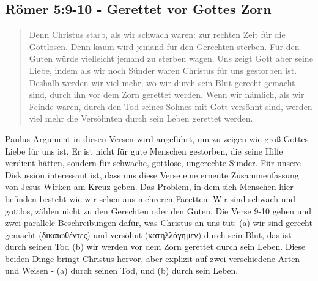 \subsection{Römer 5:9-10 - Gerettet vor Gottes Zorn}
\begin{quote}
	Denn Christus starb, als wir schwach waren: zur rechten Zeit für die Gottlosen.
	Denn kaum wird jemand für den Gerechten sterben. Für den Guten würde vielleicht jemand zu sterben wagen.
	Uns zeigt Gott aber seine Liebe, indem als wir noch Sünder waren Christus für uns gestorben ist.
	Deshalb werden wir viel mehr, wo wir durch sein Blut gerecht gemacht sind, durch ihn vor dem Zorn gerettet werden.
	Wenn wir nämlich, als wir Feinde waren, durch den Tod seines Sohnes mit Gott versöhnt sind,
	werden viel mehr die Versöhnten durch sein Leben gerettet werden.
\end{quote}
Paulus Argument in diesen Versen wird angeführt, um zu zeigen wie groß Gottes Liebe für uns ist.
Er ist nicht für gute Menschen gestorben, die seine Hilfe verdient hätten, sondern für schwache, gottlose, ungerechte Sünder.
Für unsere Diskussion interessant ist, dass uns diese Verse eine erneute Zusammenfassung von Jesus Wirken am Kreuz geben.
Das Problem, in dem sich Menschen hier befinden besteht wie wir sehen aus mehreren Facetten:
Wir sind schwach und gottlos, zählen nicht zu den Gerechten oder den Guten.
Die Verse 9-10 geben und zwei parallele Beschreibungen dafür, was Christus an uns tut:
(a) wir sind gerecht gemacht (δικαιωθέντες) und versöhnt (κατηλλάγημεν) durch sein Blut, das ist durch seinen Tod
(b) wir werden vor dem Zorn gerettet durch sein Leben.
Diese beiden Dinge bringt Christus hervor, aber explizit auf zwei verschiedene Arten und Weisen - (a) durch seinen Tod, und (b) durch sein Leben.

